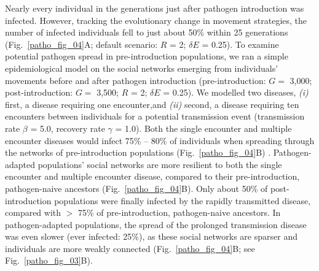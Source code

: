 Nearly every individual in the generations just after pathogen introduction was infected.
However, tracking the evolutionary change in movement strategies, the number of infected individuals fell to just about 50\% within 25 generations (Fig.~\ref{patho_fig_04}A; default scenario: $R$ = 2; $\delta E$ = 0.25).
To examine potential pathogen spread in pre-introduction populations, we ran a simple epidemiological model on the social networks emerging from individuals' movements before and after pathogen introduction (pre-introduction: $G =$ 3,000; post-introduction: $G =$ 3,500; $R$ = 2; $\delta E$ = 0.25).
We modelled two diseases, \textit{(i)} first, a disease requiring one encounter,and \textit{(ii)} second, a disease requiring ten encounters between individuals for a potential transmission event (transmission rate $\beta$ = 5.0, recovery rate $\gamma$ = 1.0).
Both the single encounter and multiple encounter diseases would infect 75\% -- 80\% of individuals when spreading through the networks of pre-introduction populations (Fig.~\ref{patho_fig_04}B)
.
Pathogen-adapted populations' social networks are more resilient to both the single encounter and multiple encounter disease, compared to their pre-introduction, pathogen-naive ancestors (Fig.~\ref{patho_fig_04}B).
Only about 50\% of post-introduction populations were finally infected by the rapidly transmitted disease, compared with $>$ 75\% of pre-introduction, pathogen-naive ancestors.
In pathogen-adapted populations, the spread of the prolonged transmission disease was even slower (ever infected: 25\%), as these social networks are sparser and individuals are more weakly connected (Fig.~\ref{patho_fig_04}B; see Fig.~\ref{patho_fig_03}B).

